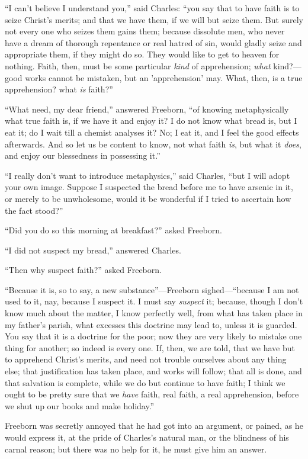 ``I can't believe I understand you,'' said Charles:
``you say that to have faith is to seize Christ's merits; and that
we have them, if we will but seize them. But surely not every one who
seizes them gains them; because dissolute men, who never have a dream
of thorough repentance or real hatred of sin, would gladly seize and
appropriate them, if they might do so. They would like to get to
heaven for nothing. Faith, then, must be some particular \emph{kind}
of apprehension; \emph{what} kind?—good works cannot be mistaken,
but an 'apprehension' may. What, then, is a true apprehension? what \emph{is}
faith?''

``What need, my dear friend,'' answered Freeborn, ``of
knowing metaphysically what true faith is, if we have it and enjoy it?
I do not know what bread is, but I eat it; do I wait till a chemist
analyses it? No; I eat it, and I feel the good effects
afterwards. And so let us be content to know, not what faith \emph{is},
but what it \emph{does}, and enjoy our blessedness in possessing
it.''

``I really don't want to introduce metaphysics,'' said
Charles, ``but I will adopt your own image. Suppose I suspected
the bread before me to have arsenic in it, or merely to be
unwholesome, would it be wonderful if I tried to ascertain how the
fact stood?''

``Did you do so this morning at breakfast?'' asked
Freeborn.

``I did not suspect my bread,'' answered Charles.

``Then why suspect faith?'' asked Freeborn.

``Because it is, so to say, a new substance''—Freeborn
sighed—``because I am not used to it, nay, because I suspect it.
I must say \emph{suspect} it; because, though I don't know much about
the matter, I know perfectly well, from what has taken place in my
father's parish, what excesses this doctrine may lead to, unless it is
guarded. You say that it is a doctrine for the poor; now they are very
likely to mistake one thing for another; so indeed is every one. If,
then, we are told, that we have but to apprehend Christ's merits, and
need not trouble ourselves about any thing else; that justification
has taken place, and works will follow; that all is done, and that
salvation is complete, while we do but continue to have faith; I think
we ought to be pretty sure that we \emph{have} faith, real faith, a real
apprehension, before we shut up our books and make holiday.''

Freeborn was secretly annoyed that he had got into an argument, or
pained, as he would express it, at the pride of Charles's
natural man, or the blindness of his carnal reason; but there was no
help for it, he must give him an answer.


